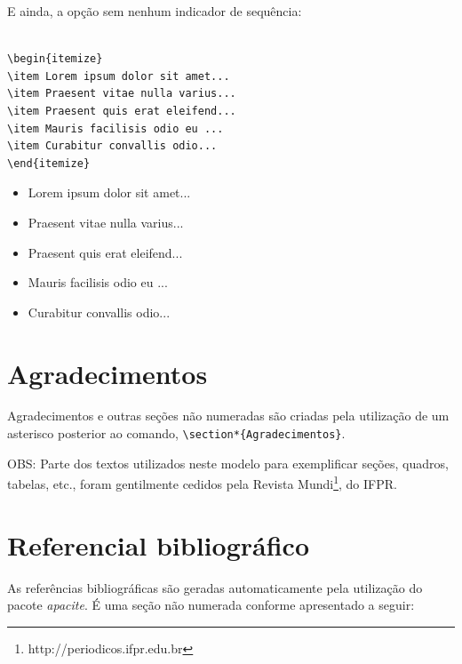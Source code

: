 \documentclass[12pt,A4,A4pt]{article}
\begin{document}
E ainda, a opção sem nenhum indicador de sequência:

\begin{verbatim}
    
\begin{itemize} 
\item Lorem ipsum dolor sit amet...
\item Praesent vitae nulla varius...
\item Praesent quis erat eleifend...
\item Mauris facilisis odio eu ...
\item Curabitur convallis odio...
\end{itemize}

\end{verbatim}

\begin{itemize} 
\item Lorem ipsum dolor sit amet...
\item Praesent vitae nulla varius...
\item Praesent quis erat eleifend...
\item Mauris facilisis odio eu ...
\item Curabitur convallis odio...
\end{itemize}

\section*{Agradecimentos}
\hspace{0.5cm}Agradecimentos e outras seções não numeradas são criadas pela utilização de um asterisco posterior ao comando, \verb|\section*{Agradecimentos}|.

OBS: Parte dos textos utilizados neste modelo para exemplificar seções, quadros, tabelas, etc., foram gentilmente cedidos pela Revista Mundi\footnote{http://periodicos.ifpr.edu.br}, do IFPR.

\section*{Referencial bibliográfico}
\hspace{0.5cm}As referências bibliográficas são geradas automaticamente pela utilização do pacote \emph{apacite}. É uma seção não numerada conforme apresentado a seguir:




\end{document}
